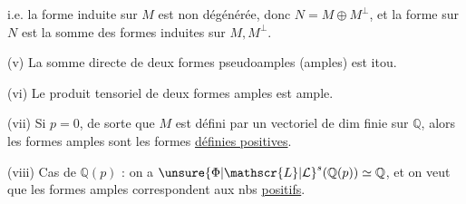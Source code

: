   i.e. la forme induite sur $M$  est non dégénérée, donc $N=M\oplus M^\perp$, et la forme sur $N$ est la somme des formes induites sur $M,M^\perp$.

(v) La somme directe de deux formes  pseudoamples (amples) est itou.

(vi) Le produit tensoriel de deux formes amples est ample.

(vii) Si $p=0$, de sorte que  $M$ est défini par un vectoriel de dim finie sur $\mathbb{Q}$, alors les formes amples sont les formes \uline{définies positives}. 

(viii) Cas de $\mathbb{Q}(p)$ : on a $\unsure{\Phi|\mathscr{L}|\mathcal{L}}^s(\mathbb{Q}(p))\simeq\mathbb{Q}$, et on veut que les formes amples correspondent aux nbs  \uline{positifs}.
